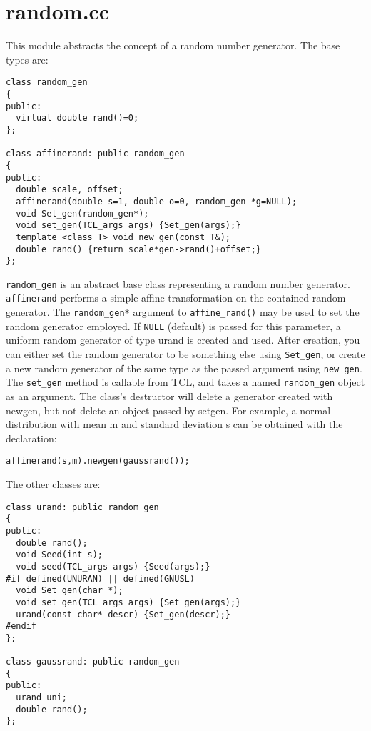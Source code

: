 \section{random.cc}\label{random}

This module abstracts the concept of a random number generator. The
base types are:

\begin{verbatim}
class random_gen
{
public:
  virtual double rand()=0;
};

class affinerand: public random_gen
{
public:
  double scale, offset;
  affinerand(double s=1, double o=0, random_gen *g=NULL);
  void Set_gen(random_gen*);
  void set_gen(TCL_args args) {Set_gen(args);}
  template <class T> void new_gen(const T&);
  double rand() {return scale*gen->rand()+offset;}
};
\end{verbatim}

\verb+random_gen+ is an abstract base class representing a random
number generator. \verb+affinerand+ performs a simple affine
transformation on the contained random generator. The
\verb+random_gen*+ argument to \verb+affine_rand()+ may be used to set
the random generator employed. If \verb+NULL+ (default) is passed for
this parameter, a uniform random generator of type urand is created
and used. After creation, you can either set the random generator to
be something else using \verb+Set_gen+, or create a new random
generator of the same type as the passed argument using
\verb+new_gen+. The \verb+set_gen+ method is callable from TCL, and
takes a named \verb+random_gen+ object as an argument. The class's
destructor will delete a generator created with newgen, but not delete
an object passed by setgen. For example, a normal distribution with
mean m and standard deviation s can be obtained with the declaration:
\begin{verbatim}
affinerand(s,m).newgen(gaussrand());
\end{verbatim}

The other classes are:

\begin{verbatim}
class urand: public random_gen
{
public:
  double rand();
  void Seed(int s);
  void seed(TCL_args args) {Seed(args);}
#if defined(UNURAN) || defined(GNUSL)
  void Set_gen(char *);
  void set_gen(TCL_args args) {Set_gen(args);}
  urand(const char* descr) {Set_gen(descr);}
#endif
};

class gaussrand: public random_gen
{
public:
  urand uni;
  double rand();
};
\end{verbatim}

